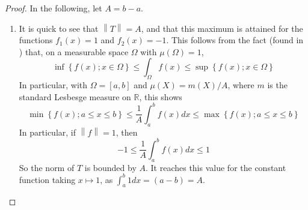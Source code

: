 \documentclass[12pt]{article}
\newcommand{\R}{\mathbb{R}}
\theoremstyle{definition}
\begin{document}
\begin{proof}
		In the following, let $A = b-a$.
	\begin{enumerate}[label=(\roman*)]
		\item It is quick to see that $\left \lVert { T } \right \lVert  = A$, and that this maximum is attained for the functions $f_1(x) = 1$ and $f_2(x) = -1$. This follows from the fact (found in \cite{rudin}) that, on a measurable space $\Omega$ with $\mu(\Omega) = 1$, 
			\[\inf\left\{ f(x); x \in \Omega \right\} \leq \int_\Omega f(x) \leq \sup\left\{ f(x); x \in \Omega \right\}\]
			In particular, with $\Omega = [a,b]$ and $\mu(X) = m(X)/A$, where $m$ is the standard Lesbesge measure on $\R$, this shows
			\[\min\left\{ f(x); a \leq x \leq b \right\} \leq \frac{1}{A} \int_a^b f(x) dx \leq \max\left\{ f(x); a \leq x \leq b \right\}\]
			In particular, if $\left \lVert { f } \right \lVert  = 1$, then 
			\[ -1 \leq \frac{1}{A}\int_a^b f(x)dx \leq 1\]
			So the norm of $T$ is bounded by $A$. It reaches this value for the constant function taking $x \mapsto 1$, as $\int_a^b 1 dx = (a-b) = A$.


\end{enumerate}
\end{proof}
\end{document}
